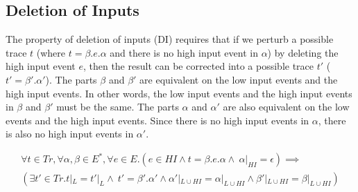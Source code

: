 \documentclass[10pt,a4paper,oneside]{article}
\begin{document}
\subsection{Deletion of Inputs} \label{sec:em:DI}
The property of deletion of inputs (DI) \cite{MANT-00-CSF} requires that if we perturb a possible trace $t$ (where $t = \beta.e.\alpha$ and there is no high input event in $\alpha$) by deleting the high input event $e$, then the result can be corrected into a possible trace $t'$ ($t' = \beta'.\alpha'$). The parts $\beta$ and $\beta'$ are equivalent on the low input events and the high input events. In other words, the low input events and the high input events in $\beta$ and $\beta'$ must be the same. The parts $\alpha$ and $\alpha'$ are also equivalent on the low events and the high input events. Since there is no high input events in $\alpha$, there is also no high input events in $\alpha'$.

\begin{multline*}\label{equa:DI:Mantel}
\forall t \in Tr, \forall \alpha, \beta \in E^*, \forall e \in E. (e \in HI \wedge t =\beta.e.\alpha \wedge\ \alpha|_{HI} = \epsilon) \implies \\ (\exists t' \in Tr. t|_L = t'|_L  \wedge\ t' = \beta'.\alpha'  \wedge \alpha'|_{L \cup HI} = \alpha|_{L \cup HI} \wedge \beta'|_{L \cup HI} = \beta|_{L \cup HI})
\end{multline*}
\end{document}
